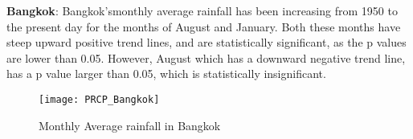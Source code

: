 \textbf{Bangkok}: Bangkok'smonthly average rainfall has been increasing from 1950 to the present day for the months of August and January. Both these months have steep upward positive trend lines, and are statistically significant, as the p values are lower than 0.05. However, August which has a downward negative trend line, has a p value larger than 0.05, which is statistically insignificant. 

\begin{figure}[h!]
  \centering
  \texttt{[image: PRCP\_Bangkok]}
  \caption{Monthly Average rainfall in Bangkok}
  \label{fig:PRCP_bangkok}
\end{figure}







